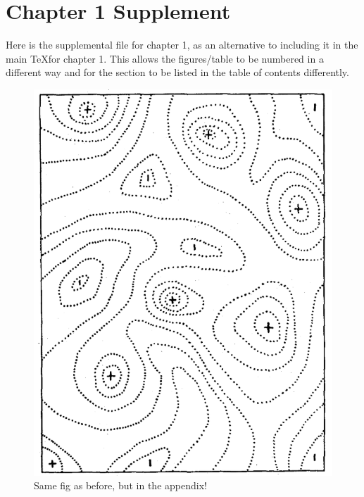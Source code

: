 \chapter{Chapter 1 Supplement} %

\label{Supp_chap1}

Here is the supplemental file for chapter 1, as an alternative to including it in the main \TeX for chapter 1. This allows the figures/table to be numbered in a different way and for the section to be listed in the table of contents differently. 


\begin{figure}[h] %
	\centering
	\includegraphics[scale=0.4]{Figs/Wright_1932_1.pdf}
    \caption[Same Fig]{Same fig as before, but in the appendix!}
    \label{Another_fig}
\end{figure}
